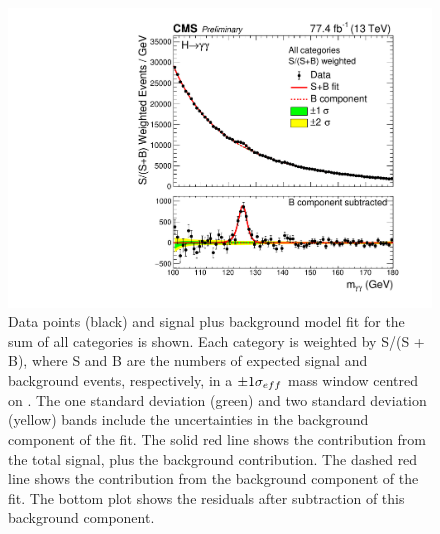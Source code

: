 \begin{figure}[hptb]
\centering
\includegraphics[width=\textwidth]{Figures/Results/MassPlot.pdf}
\caption{
  Data points (black) and signal plus background model fit for the sum of all categories is shown. 
  Each category is weighted by S/(S + B), 
  where S and B are the numbers of expected signal and background events, respectively, 
  in a $\pm 1 \sigma_{eff}$ mass window centred on \mH. 
  The one standard deviation (green) and two standard deviation (yellow) bands 
  include the uncertainties in the background component of the fit. 
  The solid red line shows the contribution from the total signal, plus the background contribution. 
  The dashed red line shows the contribution from the background component of the fit. 
  The bottom plot shows the residuals after subtraction of this background component.
}
\label{fig:results_MassPlot}
\end{figure}


